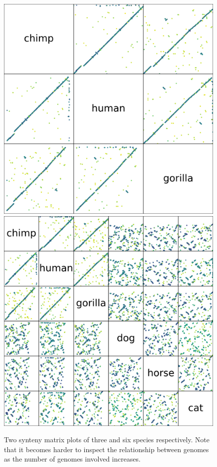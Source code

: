 \documentclass{vgtc}                      %
\begin{document}
\begin{figure}[t]
 \centering
 \includegraphics[width=0.48\columnwidth]{scatterplot_matrix_3}
 \includegraphics[width=0.48\columnwidth]{scatterplot_matrix_6}
 \caption{Two synteny matrix plots of three and six species respectively. Note that it becomes harder to inspect the relationship between genomes as the number of genomes involved increases.}
 \label{fig:synteny_matrices}
\end{figure}
\end{document}
